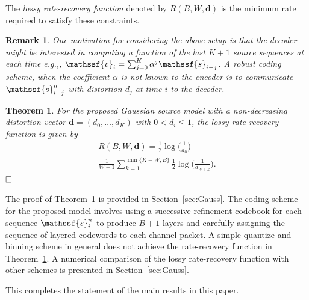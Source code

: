 \documentclass[journal, twocolumn, 10pt]{IEEEtran}
\newtheorem{remark}{Remark}
\newtheorem{thm}{Theorem}
\newcommand{\bd}{{\mathbf{d}}}
\newcommand{\al}{\alpha}
\newcommand{\rvs}{{\mathssf{s}}}    %
\newcommand{\rvv}{{\mathssf{v}}}    %
\begin{document}
The {\em lossy rate-recovery function} denoted by $R(B, W, \bd)$ is the minimum rate required to satisfy these constraints.

\begin{remark}
One motivation for considering the above setup is that the decoder might be interested in computing a function of the last $K+1$ source sequences at each time e.g.,, $\rvv_i = \sum_{j=0}^K \al^j \rvs_{i-j}$. A robust coding scheme, when the coefficient $\al$ is not known to the encoder is to communicate $\rvs^n_{i-j}$ with distortion $d_{j}$ at time $i$ to the decoder.
\end{remark}
\begin{thm}
For the proposed Gaussian source model with {a non-decreasing distortion }vector $\bd = (d_0,\ldots, d_K)$ with $0 < d_i \le 1$,  the lossy rate-recovery function is given by
\begin{multline}
R(B,W,\bd) = \frac{1}{2}\log \bigg(\frac{1}{d_0}\bigg) + \\ \frac{1}{W+1}\sum_{k=1}^{\min\{K-W,B\}}\frac{1}{2}\log \bigg(\frac{1}{d_{W+k}}\bigg). \label{eq:det-rate-Gaussian}
\end{multline}$\hfill\Box$
\label{thm:gauss-rate}
\end{thm}

The proof of Theorem~\ref{thm:gauss-rate} is provided in Section~\ref{sec:Gauss}. The coding scheme for the proposed model involves using a successive refinement codebook for each sequence $\rvs_i^n$ to produce $B+1$ layers and carefully assigning the sequence of layered codewords to each channel packet. A simple quantize and binning scheme in general does not achieve the rate-recovery function in Theorem~\ref{thm:gauss-rate}. 
A numerical comparison of the lossy rate-recovery function with other schemes is presented in Section~\ref{sec:Gauss}. 

This completes the statement of the main results in this paper.
\end{document}
